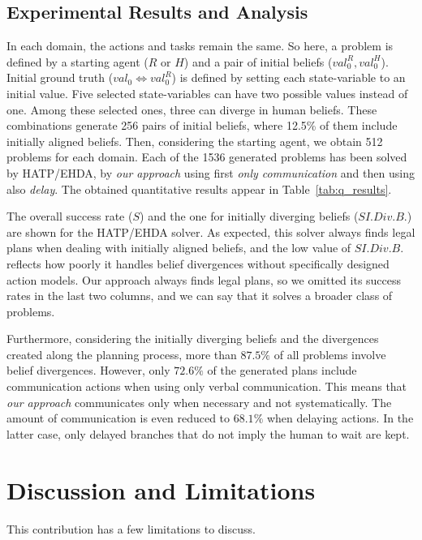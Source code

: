 \subsection{Experimental Results and Analysis}

In each domain, the actions and tasks remain the same. So here, a problem is defined by a starting agent ($R$ or $H$) and a pair of initial beliefs ($val^R_0, val^H_ 0$).
Initial ground truth ($val_0 \Leftrightarrow val^R_0$) is defined by setting each state-variable to an initial value. Five selected state-variables can have two possible values instead of one. Among these selected ones, three can diverge in human beliefs. These combinations generate 256 pairs of initial beliefs, where 12.5\% of them include initially aligned beliefs. Then, considering the starting agent, we obtain 512 problems for each domain. 
Each of the 1536 generated problems has been solved by HATP/EHDA, by \textit{our approach} using first \textit{only communication} and then using also \textit{delay}.
The obtained quantitative results appear in Table~\ref{tab:q_results}.
 
The overall success rate ($S$) and the one for initially diverging beliefs ($S I.Div.B.$) are shown for the HATP/EHDA solver. As expected, this solver always finds legal plans when dealing with initially aligned beliefs, and the low value of $S I.Div.B.$ reflects how poorly it handles belief divergences without specifically designed action models.
Our approach always finds legal plans, so we omitted its success rates in the last two columns, and we can say that it solves a broader class of problems.

Furthermore, considering the initially diverging beliefs and the divergences created along the planning process, more than $87.5\%$ of all problems involve belief divergences. 
However, only $72.6\%$ of the generated plans include communication actions when using only verbal communication.
This means that \textit{our approach} communicates only when necessary and not systematically. 
The amount of communication is even reduced to $68.1\%$ when delaying actions. In the latter case, only delayed branches that do not imply the human to wait are kept. 

\section{Discussion and Limitations}

This contribution has a few limitations to discuss.

